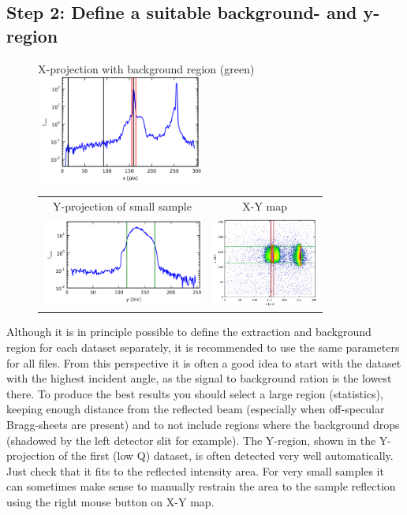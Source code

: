   
  \subsection{Step 2: Define a suitable background- and y-region}
    \begin{figure}
    \centering
      X-projection with background region (green)\\
      \includegraphics[width=155pt]{screenshots/background.png}
    \begin{tabular}{cc}
        Y-projection of small sample & X-Y map \\
      \includegraphics[width=150pt]{screenshots/yregion.png} & \includegraphics[width=100pt]{screenshots/yregionmap.png}
    \end{tabular}     
    \end{figure}
  
    Although it is in principle possible to define the extraction and background region for each dataset separately, it is recommended to use the same parameters for all files.
    From this perspective it is often a good idea to start with the dataset with the highest incident angle, as the signal to background ration is the lowest there.
    To produce the best results you should select a large region (statistics), keeping enough distance from the reflected beam (especially when off-specular Bragg-sheets are present) and to not include regions where the background drops (shadowed by the left detector slit for example).
    The Y-region, shown in the Y-projection of the first (low Q) dataset, is often detected very well automatically.
    Just check that it fits to the reflected intensity area. 
    For very small samples it can sometimes make sense to manually restrain the area to the sample reflection using the right mouse button on X-Y map.
  
